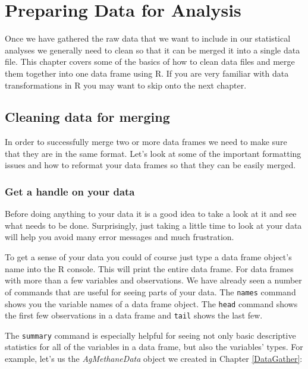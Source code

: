 



\chapter{Preparing Data for Analysis}\label{DataClean}

Once we have gathered the raw data that we want to include in our statistical analyses we generally need to clean so that it can be merged it into a single data file. This chapter covers some of the basics of how to clean data files and merge them together into one data frame using R. If you are very familiar with data transformations in R you may want to skip onto the next chapter. 

\section{Cleaning data for merging}

In order to successfully merge two or more data frames we need to make sure that they are in the same format. Let's look at some of the important formatting issues and how to reformat your data frames so that they can be easily merged.

\subsection{Get a handle on your data}

Before doing anything to your data it is a good idea to take a look at it and see what needs to be done. Surprisingly, just taking a little time to look at your data will help you avoid many error messages and much frustration. 

To get a sense of your data you could of course just type a data frame object's name into the R console. This will print the entire data frame. For data frames with more than a few variables and observations. We have already seen a number of commands that are useful for seeing parts of your data. The \texttt{names} command shows you the variable names of a data frame object. The \texttt{head} command shows the first few observations in a data frame and \texttt{tail} shows the last few.

The \texttt{summary} command is especially helpful for seeing not only basic descriptive statistics for all of the variables in a data frame, but also the variables' types. For example, let's us the \emph{AgMethaneData} object we created in Chapter \ref{DataGather}:

